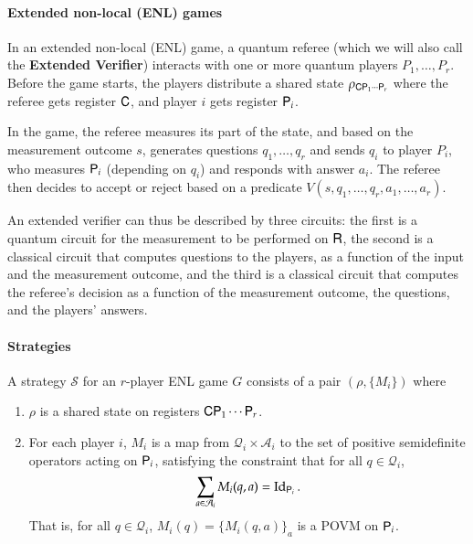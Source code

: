 \paragraph{Extended non-local (ENL) games} In an extended non-local (ENL) game, a quantum referee (which we will also call the \textbf{Extended Verifier}) interacts with one or more quantum players $P_1,\ldots,P_r$. Before the game starts, the players distribute a shared state $\rho_{{\mathsf{C}} {\mathsf{P}}_1 \cdots {\mathsf{P}}_r}$ where the referee gets register ${\mathsf{C}}$, and player $i$ gets register ${\mathsf{P}}_i$. 

In the game, the referee measures its part of the state, and based on the measurement outcome $s$, generates questions $q_1,\ldots,q_r$ and sends $q_i$ to player $P_i$, who measures ${\mathsf{P}}_i$ (depending on $q_i$) and  responds with answer $a_i$. The referee then decides to accept or reject based on a predicate $V(s,q_1,\ldots,q_r,a_1,\ldots,a_r)$.

An extended verifier can thus be described by three circuits: the first is a quantum circuit for the measurement to be performed on ${\mathsf{R}}$, the second is a classical circuit that computes questions to the players, as a function of the input and the measurement outcome, and the third is a classical circuit that computes the referee's decision as a function of the measurement outcome, the questions, and the players' answers. 



\paragraph{Strategies}

A strategy $\mathcal{S}$ for an $r$-player ENL game $G$ consists of a pair $(\rho,\{M_i\})$ where
\begin{enumerate}
	\item $\rho$ is a shared state on registers ${\mathsf{C}} {\mathsf{P}}_1 \cdots {\mathsf{P}}_r$.
	\item For each player $i$, $M_i$ is a map from $\mathcal{Q}_i \times \mathcal{A}_i$ to the set of positive semidefinite operators acting on ${\mathsf{P}}_i$, satisfying the constraint that for all $q \in \mathcal{Q}_i$,
	\[
		\sum_{a \in \mathcal{A}_i} M_i(q,a) = \mathop{\mathrm{Id}}\!\mathinner{}_{{\mathsf{P}}_i}.
	\]
	That is, for all $q \in \mathcal{Q}_i$, $M_i(q) = \{M_i(q,a)\}_a$ is a POVM on ${\mathsf{P}}_i$.
\end{enumerate}


